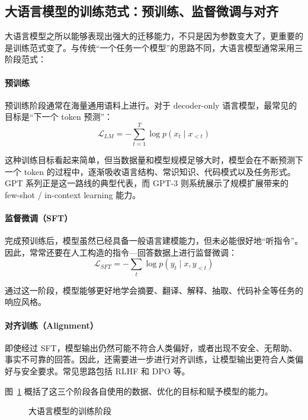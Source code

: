 \subsection{大语言模型的训练范式：预训练、监督微调与对齐}

大语言模型之所以能够表现出强大的迁移能力，不只是因为参数变大了，更重要的是训练范式变了。与传统“一个任务一个模型”的思路不同，大语言模型通常采用三阶段范式：

\paragraph{预训练}

预训练阶段通常在海量通用语料上进行。对于 decoder-only 语言模型，最常见的目标是“下一个 token 预测”：
\[
\mathcal{L}_{LM}
=
- \sum_{t=1}^{T}\log p(x_t \mid x_{<t})
\]

这种训练目标看起来简单，但当数据量和模型规模足够大时，模型会在不断预测下一个 token 的过程中，逐渐吸收语言结构、常识知识、代码模式以及任务形式。GPT 系列正是这一路线的典型代表，而 GPT-3 则系统展示了规模扩展带来的 few-shot / in-context learning 能力。

\paragraph{监督微调（SFT）}

完成预训练后，模型虽然已经具备一般语言建模能力，但未必能很好地“听指令”。因此，常常还要在人工构造的指令—回答数据上进行监督微调：
\[
\mathcal{L}_{SFT}
=
- \sum_t \log p(y_t \mid x, y_{<t})
\]

通过这一阶段，模型能够更好地学会摘要、翻译、解释、抽取、代码补全等任务的响应风格。

\paragraph{对齐训练（Alignment）}

即使经过 SFT，模型输出仍然可能不符合人类偏好，或者出现不安全、无帮助、事实不可靠的回答。因此，还需要进一步进行对齐训练，让模型输出更符合人类偏好与安全要求。常见思路包括 RLHF 和 DPO 等。

图~\ref{fig:ch11_stages} 概括了这三个阶段各自使用的数据、优化的目标和赋予模型的能力。

\begin{figure}[H]
  \centering
  \caption{大语言模型的训练阶段}
  \label{fig:ch11_stages}
\end{figure}

